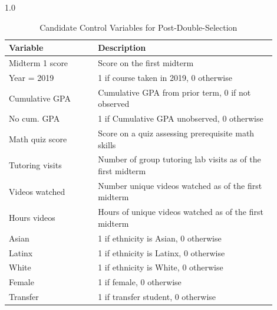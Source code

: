 \begin{spacing}{1.0} 
\begin{table} \centering \caption{Candidate Control Variables for Post-Double-Selection} 
\label{tab:controlvars_desc} 
\begin{threeparttable} 
\begin{tabular}{p{0.3\linewidth} p{0.6\linewidth}}
\toprule
Variable & Description \\
\midrule
Midterm 1 score & Score on the first midterm \\
Year = 2019 & 1 if course taken in 2019, 0 otherwise \\
Cumulative GPA & Cumulative GPA from prior term, 0 if not observed \\
No cum. GPA & 1 if Cumulative GPA unobserved, 0 otherwise \\
Math quiz score & Score on a quiz assessing prerequisite math skills \\
Tutoring visits & Number of group tutoring lab visits as of the first midterm \\
Videos watched & Number unique videos watched as of the first midterm \\
Hours videos & Hours of unique videos watched as of the first midterm \\
Asian & 1 if ethnicity is Asian, 0 otherwise \\
Latinx & 1 if ethnicity is Latinx, 0 otherwise \\
White & 1 if ethnicity is White, 0 otherwise \\
Female & 1 if female, 0 otherwise \\
Transfer & 1 if transfer student, 0 otherwise \\
\bottomrule
\end{tabular}
\end{threeparttable}
\end{table} 
\end{spacing}